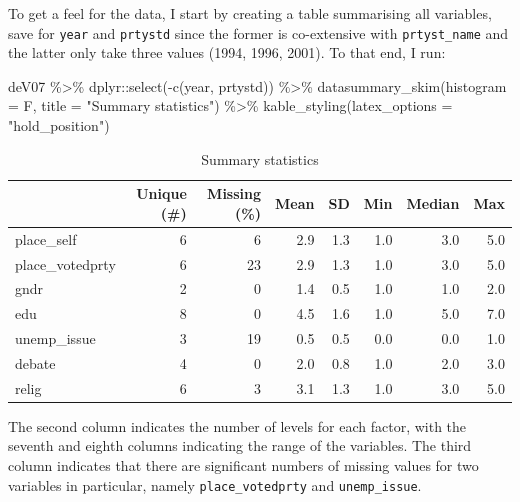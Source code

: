\documentclass[
]{article}
\newenvironment{Shaded}{\begin{snugshade}}{\end{snugshade}}
\newcommand{\AttributeTok}[1]{\textcolor[rgb]{0.77,0.63,0.00}{#1}}
\newcommand{\FunctionTok}[1]{\textcolor[rgb]{0.00,0.00,0.00}{#1}}
\newcommand{\NormalTok}[1]{#1}
\newcommand{\SpecialCharTok}[1]{\textcolor[rgb]{0.00,0.00,0.00}{#1}}
\newcommand{\StringTok}[1]{\textcolor[rgb]{0.31,0.60,0.02}{#1}}
\begin{document}
To get a feel for the data, I start by creating a table summarising all
variables, save for \texttt{year} and \texttt{prtystd} since the former
is co-extensive with \texttt{prtyst\_name} and the latter only take
three values (1994, 1996, 2001). To that end, I run:

\begin{Shaded}
\begin{Highlighting}[]
\NormalTok{deV07 }\SpecialCharTok{\%\textgreater{}\%}
\NormalTok{  dplyr}\SpecialCharTok{::}\FunctionTok{select}\NormalTok{(}\SpecialCharTok{{-}}\FunctionTok{c}\NormalTok{(year, prtystd)) }\SpecialCharTok{\%\textgreater{}\%} 
  \FunctionTok{datasummary\_skim}\NormalTok{(}\AttributeTok{histogram =}\NormalTok{ F,}
                   \AttributeTok{title =} \StringTok{"Summary statistics"}\NormalTok{) }\SpecialCharTok{\%\textgreater{}\%}
  \FunctionTok{kable\_styling}\NormalTok{(}\AttributeTok{latex\_options =} \StringTok{"hold\_position"}\NormalTok{) }
\end{Highlighting}
\end{Shaded}

\begin{table}[!h]

\caption{\label{tab:datasummary-table-num}Summary statistics}
\centering
\begin{tabular}[t]{lrrrrrrr}
\toprule
  & Unique (\#) & Missing (\%) & Mean & SD & Min & Median & Max\\
\midrule
place\_self & 6 & 6 & \num{2.9} & \num{1.3} & \num{1.0} & \num{3.0} & \num{5.0}\\
place\_votedprty & 6 & 23 & \num{2.9} & \num{1.3} & \num{1.0} & \num{3.0} & \num{5.0}\\
gndr & 2 & 0 & \num{1.4} & \num{0.5} & \num{1.0} & \num{1.0} & \num{2.0}\\
edu & 8 & 0 & \num{4.5} & \num{1.6} & \num{1.0} & \num{5.0} & \num{7.0}\\
unemp\_issue & 3 & 19 & \num{0.5} & \num{0.5} & \num{0.0} & \num{0.0} & \num{1.0}\\
debate & 4 & 0 & \num{2.0} & \num{0.8} & \num{1.0} & \num{2.0} & \num{3.0}\\
relig & 6 & 3 & \num{3.1} & \num{1.3} & \num{1.0} & \num{3.0} & \num{5.0}\\
\bottomrule
\end{tabular}
\end{table}

The second column indicates the number of levels for each factor, with
the seventh and eighth columns indicating the range of the variables.
The third column indicates that there are significant numbers of missing
values for two variables in particular, namely \texttt{place\_votedprty}
and \texttt{unemp\_issue}.
\end{document}
